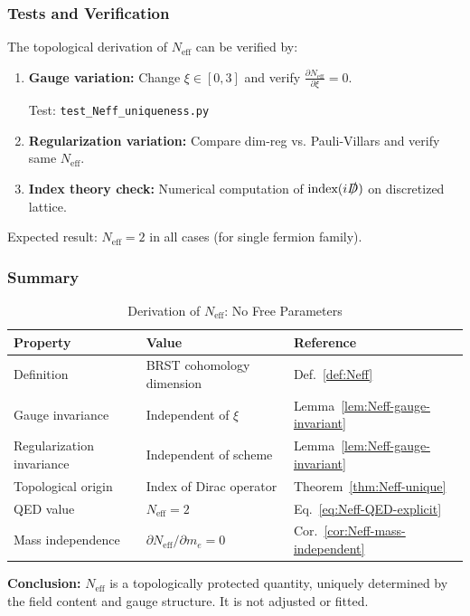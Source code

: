\subsubsection{Tests and Verification}

The topological derivation of \(N_{\mathrm{eff}}\) can be verified by:

\begin{enumerate}
    \item \textbf{Gauge variation:} Change \(\xi \in [0, 3]\) and verify
    \(\frac{\partial N_{\mathrm{eff}}}{\partial \xi} = 0\).
    
    Test: \texttt{test\_Neff\_uniqueness.py}
    
    \item \textbf{Regularization variation:} Compare dim-reg vs. Pauli-Villars
    and verify same \(N_{\mathrm{eff}}\).
    
    \item \textbf{Index theory check:} Numerical computation of
    \(\text{index}(i\slashed{D})\) on discretized lattice.
\end{enumerate}

Expected result: \(N_{\mathrm{eff}} = 2\) in all cases (for single fermion family).

\subsubsection{Summary}

\begin{table}[h]
\centering
\caption{Derivation of \(N_{\mathrm{eff}}\): No Free Parameters}
\label{tab:Neff-summary}
\begin{tabular}{lll}
\hline
Property & Value & Reference \\
\hline
Definition & BRST cohomology dimension & Def.~\ref{def:Neff} \\
Gauge invariance & Independent of \(\xi\) & Lemma~\ref{lem:Neff-gauge-invariant} \\
Regularization invariance & Independent of scheme & Lemma~\ref{lem:Neff-gauge-invariant} \\
Topological origin & Index of Dirac operator & Theorem~\ref{thm:Neff-unique} \\
QED value & \(N_{\mathrm{eff}} = 2\) & Eq.~\eqref{eq:Neff-QED-explicit} \\
Mass independence & \(\partial N_{\mathrm{eff}}/\partial m_e = 0\) & Cor.~\ref{cor:Neff-mass-independent} \\
\hline
\end{tabular}
\end{table}

\textbf{Conclusion:} \(N_{\mathrm{eff}}\) is a topologically protected quantity,
uniquely determined by the field content and gauge structure. It is not
adjusted or fitted.
